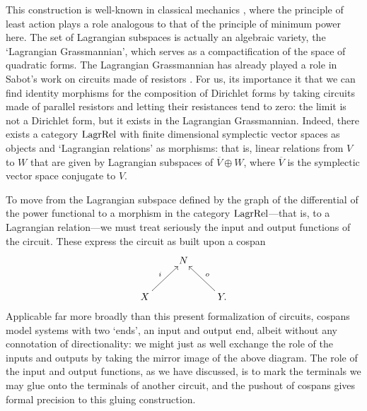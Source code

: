 This construction is well-known in classical mechanics \cite{Weinstein}, where the principle of least action plays a role analogous to that of the principle of minimum power here.   The set of Lagrangian subspaces is actually an algebraic variety,
the `Lagrangian Grassmannian', which serves as a compactification of the
space of quadratic forms.  The Lagrangian Grassmannian has already played a
role in Sabot's work on circuits made of resistors \cite{Sabot1997,Sabot2004}.
For us, its importance it that we can find identity morphisms
for the composition of Dirichlet forms by taking circuits made of parallel resistors
and letting their resistances tend to zero: the limit is not a Dirichlet form, but
it exists in the Lagrangian Grassmannian.    Indeed, 
there exists a category $\mathrm{LagrRel}$ with finite dimensional
symplectic vector spaces as objects and `Lagrangian relations' as morphisms: 
that is, linear relations from $V$ to $W$ that are given by Lagrangian subspaces of $\overline{V} \oplus W$, where $\overline{V}$ is the symplectic vector space conjugate to $V$.   

To move from the Lagrangian subspace defined by the graph of the differential of
the power functional to a morphism in the category $\mathrm{LagrRel}$---that
is, to a Lagrangian relation---we must treat seriously the input and output
functions of the circuit. These express the circuit as built upon a cospan   
\[
  \xymatrix{
    & N \\
    X \ar[ur]^{i} && Y. \ar[ul]_o
  }
\]
Applicable far more broadly than this present formalization of circuits, cospans
model systems with two `ends', an input and output end, albeit without any
connotation of directionality: we might just as well exchange the role of the
inputs and outputs by taking the mirror image of the above diagram. The role of
the input and output functions, as we have discussed, is to mark the terminals
we may glue onto the terminals of another circuit, and the pushout of cospans
gives formal precision to this gluing construction.

